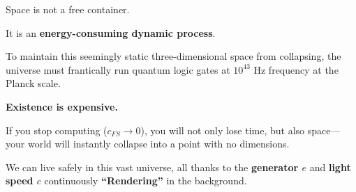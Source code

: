 Space is not a free container.

It is an \textbf{energy-consuming dynamic process}.

To maintain this seemingly static three-dimensional space from collapsing, the universe must frantically run quantum logic gates at $10^{43}$ Hz frequency at the Planck scale.

\textbf{Existence is expensive.}

If you stop computing ($c_{FS} \to 0$), you will not only lose time, but also space---your world will instantly collapse into a point with no dimensions.

We can live safely in this vast universe, all thanks to the \textbf{generator $e$} and \textbf{light speed $c$} continuously \textbf{``Rendering''} in the background.

